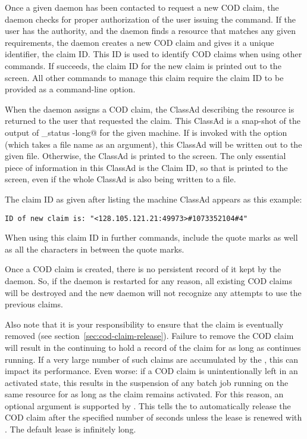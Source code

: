 Once a given  daemon has been contacted to request a new COD
claim, the  daemon checks for proper
authorization of the user
issuing the command.
If the user has the authority, and the  daemon
finds a
resource that matches any given requirements,
the  daemon
creates a new COD claim and gives it a unique identifier,
the claim ID.
This ID is used to identify COD claims when using other commands.
If  succeeds, the claim ID for the new claim is printed
out to the screen.
All other commands to manage this claim require the claim ID to be
provided as a command-line option.

When the  daemon assigns a COD claim,
the ClassAd describing the resource is returned to the user that
requested the claim. 
This ClassAd is a snap-shot of 
the output of \verb@condor_status -long@ for the given machine.
If  is invoked with the  option
(which takes a file name as an argument), this ClassAd will be written
out to the given file.
Otherwise, the ClassAd is printed to the screen.
The only essential piece of information in this ClassAd is the Claim
ID, so that is printed to the screen, even if the whole ClassAd is
also being written to a file.

The claim ID as given after listing the machine ClassAd appears as
this example:
\footnotesize
\begin{verbatim}
ID of new claim is: "<128.105.121.21:49973>#1073352104#4"
\end{verbatim}
\normalsize
When using this claim ID in further commands, include the quote
marks as well as all the characters in between the quote marks.

\Note Once a COD claim is created, there is no persistent record of it
kept by the  daemon.
So, if the  daemon is restarted for any reason, all existing
COD claims will be destroyed and the new  daemon will not
recognize any attempts to use the previous claims.

Also note that it is your responsibility to ensure that the claim is
eventually removed (see section~\ref{sec:cod-claim-release}).  Failure
to remove the COD claim will result in the  continuing
to hold a record of the claim for as long as  continues
running.  If a very large number of such claims are accumulated by the
, this can impact its performance.  Even worse: if a
COD claim is unintentionally left in an activated state, this results
in the suspension of any batch job running on the same resource for as
long as the claim remains activated.  For this reason, an optional
 argument is supported by .  This
tells the  to automatically release the COD claim after
the specified number of seconds unless the lease is renewed with
.  The default lease is infinitely long.


